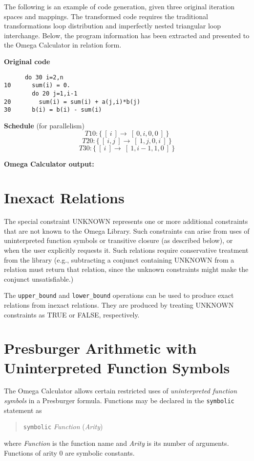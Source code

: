 The following is an example of code generation, given three original
iteration spaces and mappings.  The transformed code requires the
traditional transformations loop distribution and imperfectly nested
triangular loop interchange.   Below, the program information has been
extracted and presented to the Omega Calculator in relation form.

\vspace{0.2in}

{\bf Original code}
\begin{verbatim}
      do 30 i=2,n
10      sum(i) = 0.
        do 20 j=1,i-1
20        sum(i) = sum(i) + a(j,i)*b(j)
30      b(i) = b(i) - sum(i)
\end{verbatim}

{\bf Schedule} (for parallelism)
$$T10:\{\ [\ i\ ] \rightarrow\   [\ 0,i,0,0\ ]\ \}$$
$$T20:\{\ [\ i,j\ ] \rightarrow\ [\ 1,j,0,i\ ]\ \}$$
$$T30:\{\ [\ i\ ] \rightarrow\   [\ 1,i-1,1,0\ ]\ \}$$

{\bf Omega Calculator output:}


\section{Inexact Relations}

The special constraint UNKNOWN represents one or more additional
constraints that are not known to the Omega Library.  Such constraints
can arise from uses of uninterpreted function symbols or transitive
closure (as described below), or when the user explicitly requests it.
Such relations require conservative treatment from the library (e.g.,
subtracting a conjunct containing UNKNOWN from a relation must
return that relation, since the unknown constraints might make the
conjunct unsatisfiable.)

The {\tt upper\_bound} and {\tt lower\_bound} operations can be used to
produce exact relations from inexact relations.  They are produced by
treating UNKNOWN constraints as TRUE or FALSE, respectively.



\section{Presburger Arithmetic with Uninterpreted Function Symbols}
The Omega Calculator allows certain restricted uses of 
{\em uninterpreted function symbols} in a Presburger formula.
Functions may be declared in the {\tt symbolic} statement as
\begin{quote}
{\tt symbolic} {\em Function} ({\em Arity})
\end{quote}
where {\em Function} is the function name and 
{\em Arity} is its number of arguments.
Functions of arity 0 are symbolic constants.

